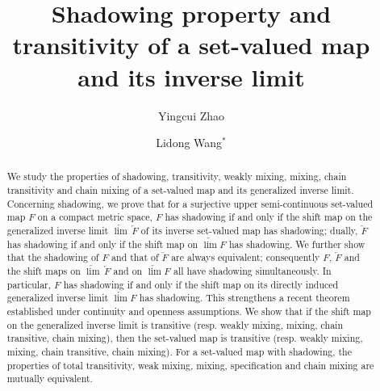 \documentclass[12pt]{amsart}
\title[Shadowing property and transitivity of a set-valued map and its inverse limit]{Shadowing property and transitivity of a set-valued map and its inverse limit}
\author[Yingcui Zhao]{Yingcui Zhao}
\author[Lidong Wang]{Lidong Wang$^\ast$}
\date{}
\theoremstyle{definition}
\begin{document}
\begin{abstract}
We study the properties of shadowing, transitivity, weakly mixing, mixing, chain transitivity and chain mixing of a set-valued map and its generalized inverse limit. Concerning shadowing, we prove that for a surjective upper semi-continuous set-valued map $F$ on a compact metric space, $F$ has shadowing if and only if the shift map on the generalized inverse limit $\underleftarrow{\lim}\,\underleftarrow{F}$ of its inverse set-valued map has shadowing; dually, $\underleftarrow{F}$ has shadowing if and only if the shift map on $\underleftarrow{\lim}F$ has shadowing. We further show that the shadowing of $F$ and that of $\underleftarrow{F}$ are always equivalent; consequently $F$, $\underleftarrow{F}$ and the shift maps on $\underleftarrow{\lim}\,\underleftarrow{F}$ and on $\underleftarrow{\lim}F$ all have shadowing simultaneously. In particular, $F$ has shadowing if and only if the shift map on its directly induced generalized inverse limit $\underleftarrow{\lim}F$ has shadowing. This strengthens a recent theorem established under continuity and openness assumptions. We show that if the shift map on the generalized inverse limit is transitive (resp. weakly mixing, mixing, chain transitive, chain mixing), then the set-valued map is transitive (resp. weakly mixing, mixing, chain transitive, chain mixing). For a set-valued map with shadowing, the properties of total transitivity, weak mixing, mixing, specification and chain mixing are mutually equivalent. 
\end{abstract}


\maketitle

\end{document}
